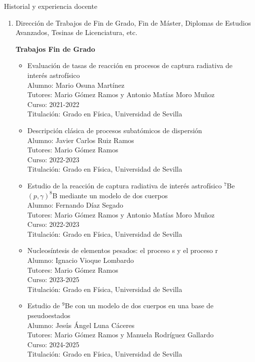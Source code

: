 \documentclass{resume2} %
\begin{document}
\begin{rSection}{Historial y experiencia docente}
\begin{enumerate}[label=\alph*.]
\begin{itemize}
\end{itemize}

\item Direcci\'on de Trabajos de Fin de Grado, Fin de M\'aster, Diplomas de Estudios Avanzados, Tesinas de Licenciatura, etc.

{\bf Trabajos Fin de Grado}

\begin{itemize}
\item Evaluaci\'on de tasas de reacci\'on en procesos de captura radiativa de inter\'es astrof\'isico \\ 
{\sc Alumno:} Mario Osuna Mart\'inez\\
{\sc Tutores:} Mario G\'omez Ramos y Antonio Mat\'ias Moro Mu\~noz\\
{\sc Curso:} 2021-2022\\
{\sc Titulaci\'on:} Grado en F\'isica, Universidad de Sevilla

\item Descripci\'on cl\'asica de procesos subat\'omicos de dispersi\'on \\ 
{\sc Alumno:} Javier Carlos Ruiz Ramos\\
{\sc Tutores:} Mario G\'omez Ramos\\
{\sc Curso:} 2022-2023\\
{\sc Titulaci\'on:} Grado en F\'isica, Universidad de Sevilla

\item  Estudio de la reacci\'on de captura radiativa de inter\'es
astrof\'isico $^7$Be$(p, \gamma)^8$B mediante un modelo de dos cuerpos\\ 
{\sc Alumno:} Fernando D\'iaz Segado\\
{\sc Tutores:} Mario G\'omez Ramos y Antonio Mat\'ias Moro Mu\~noz\\
{\sc Curso:} 2022-2023\\
{\sc Titulaci\'on:} Grado en F\'isica, Universidad de Sevilla

\item  Nucleos\'intesis
de elementos pesados: el proceso s y el
proceso r\\ 
{\sc Alumno:} Ignacio Vioque Lombardo\\
{\sc Tutores:} Mario G\'omez Ramos \\
{\sc Curso:} 2023-2025\\
{\sc Titulaci\'on:} Grado en F\'isica, Universidad de Sevilla

\item  Estudio de $^9$Be con un modelo de
dos cuerpos en una base de
pseudoestados\\ 
{\sc Alumno:} Jes\'us \'Angel Luna C\'aceres\\
{\sc Tutores:} Mario G\'omez Ramos y Manuela Rodr\'iguez Gallardo\\
{\sc Curso:} 2024-2025\\
{\sc Titulaci\'on:} Grado en F\'isica, Universidad de Sevilla


\end{itemize}
\end{enumerate}
\end{rSection}
\end{document}

